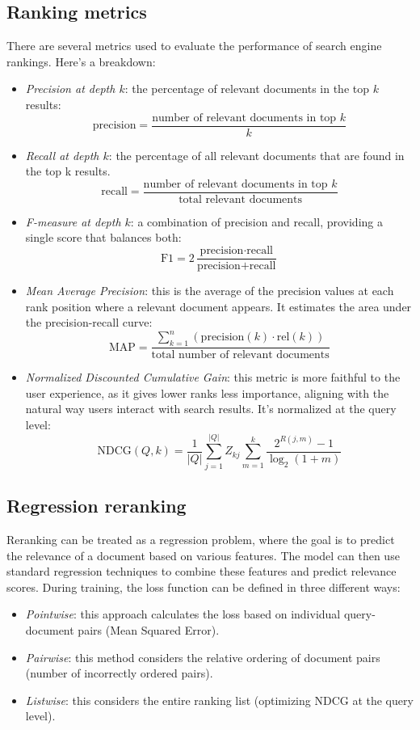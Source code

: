 \subsection{Ranking metrics}
There are several metrics used to evaluate the performance of search engine rankings. 
Here's a breakdown:
\begin{itemize}
    \item \textit{Precision at depth $k$}: the percentage of relevant documents in the top $k$ results: 
        \[\text{precision}=\dfrac{\text{number of relevant documents in top }k}{k}\]
    \item \textit{Recall at depth $k$}: the percentage of all relevant documents that are found in the top k results.
        \[\text{recall}=\dfrac{\text{number of relevant documents in top }k}{\text{total relevant documents}}\]
    \item \textit{F-measure at depth $k$}: a combination of precision and recall, providing a single score that balances both: 
        \[\text{F1}=2\dfrac{\text{precision}\cdot\text{recall}}{\text{precision}+\text{recall}}\]
    \item \textit{Mean Average Precision}: this is the average of the precision values at each rank position where a relevant document appears. 
        It estimates the area under the precision-recall curve: 
        \[\text{MAP}=\dfrac{\sum_{k=1}^n(\text{precision}(k)\cdot\text{rel}(k))}{\text{total number of relevant documents}}\]
    \item \textit{Normalized Discounted Cumulative Gain}: this metric is more faithful to the user experience, as it gives lower ranks less importance, aligning with the natural way users interact with search results. 
        It's normalized at the query level:
        \[\text{NDCG}(Q,k)=\dfrac{1}{\left\lvert Q \right\rvert}\sum_{j=1}^{\left\lvert Q \right\rvert}Z_{kj}\sum_{m=1}^k\dfrac{2^{R(j,m)}-1}{\log_2(1+m)}\]
\end{itemize}

\subsection{Regression reranking}
Reranking can be treated as a regression problem, where the goal is to predict the relevance of a document based on various features. 
The model can then use standard regression techniques to combine these features and predict relevance scores.
During training, the loss function can be defined in three different ways:
\begin{itemize}
    \item \textit{Pointwise}: this approach calculates the loss based on individual query-document pairs (Mean Squared Error).
    \item \textit{Pairwise}: this method considers the relative ordering of document pairs (number of incorrectly ordered pairs).
    \item \textit{Listwise}: this considers the entire ranking list (optimizing NDCG at the query level).
\end{itemize}